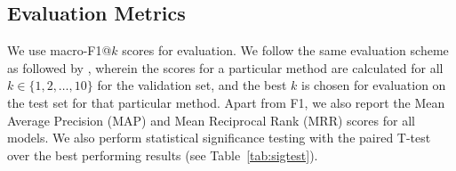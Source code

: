 









\subsection{Evaluation Metrics} \label{app:expt/datasets}

We use macro-F1@$k$ scores for evaluation. We follow the same evaluation scheme as followed by \citet{joshi2023ucreat}, wherein the scores for a particular method are calculated for all $k \in \{1, 2, \ldots, 10\}$ for the validation set, and the best $k$ is chosen for evaluation on the test set for that particular method. Apart from F1, we also report the Mean Average Precision (MAP) and Mean Reciprocal Rank (MRR) scores for all models.
We also perform statistical significance testing with the paired T-test over the best performing results (see Table~\ref{tab:sigtest}).

